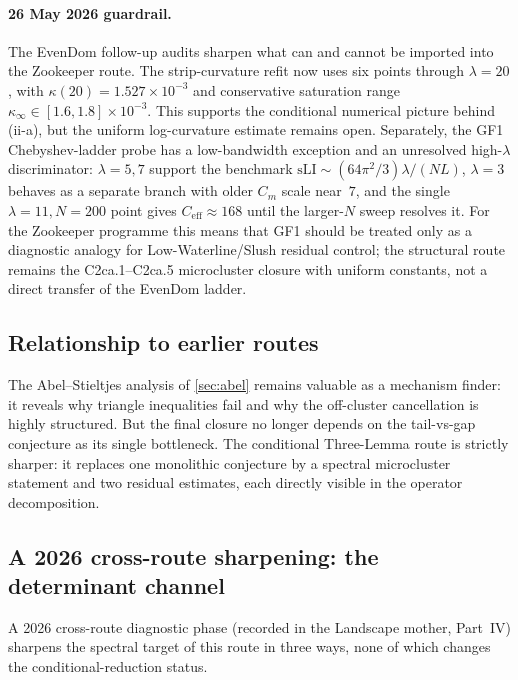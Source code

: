 \documentclass[12pt,a4paper]{article}
\theoremstyle{definition}
\theoremstyle{remark}
\begin{document}
\paragraph{26 May 2026 guardrail.}
The EvenDom follow-up audits sharpen what can and cannot be imported into
the Zookeeper route. The strip-curvature refit now uses six points through
$\lambda=20$, with $\kappa(20)=1.527\times10^{-3}$ and conservative
saturation range $\kappa_\infty\in[1.6,1.8]\times10^{-3}$. This supports
the conditional numerical picture behind (ii-a), but the uniform
log-curvature estimate remains open. Separately, the GF1 Chebyshev-ladder
probe has a low-bandwidth exception and an unresolved high-$\lambda$
discriminator: $\lambda=5,7$ support the benchmark
$\mathrm{sLI}\sim(64\pi^2/3)\lambda/(NL)$, $\lambda=3$ behaves as a
separate branch with older $C_m$ scale near~$7$, and the single
$\lambda=11,N=200$ point gives $C_{\mathrm{eff}}\approx168$ until the
larger-$N$ sweep resolves it. For the Zookeeper programme this means that
GF1 should be treated only as a diagnostic analogy for
Low-Waterline/Slush residual control; the structural route remains the
C2ca.1--C2ca.5 microcluster closure with uniform constants,
not a direct transfer of the EvenDom ladder.

\subsection{Relationship to earlier routes}

The Abel--Stieltjes analysis of \cref{sec:abel} remains valuable as a
mechanism finder: it reveals why triangle inequalities fail and why the
off-cluster cancellation is highly structured.  But the final closure no
longer depends on the tail-vs-gap conjecture as its single bottleneck.
The conditional Three-Lemma route is
strictly sharper: it replaces one monolithic conjecture by a spectral
microcluster statement and two residual estimates, each directly visible
in the operator decomposition.

\subsection{A 2026 cross-route sharpening: the determinant channel}
\label{sec:det-channel-sharpening}

A 2026 cross-route diagnostic phase (recorded in the Landscape mother, Part~IV)
sharpens the spectral target of this route in three ways, none of which changes
the conditional-reduction status.
\end{document}
